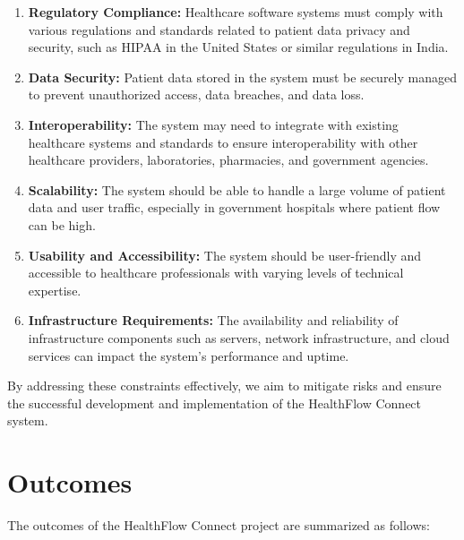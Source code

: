 \begin{enumerate}[label=\textbf{\arabic*.}]
  \item \textbf{Regulatory Compliance:} Healthcare software systems must comply with various regulations and standards related to patient data privacy and security, such as HIPAA in the United States or similar regulations in India.
  
  \item \textbf{Data Security:} Patient data stored in the system must be securely managed to prevent unauthorized access, data breaches, and data loss.
  
  \item \textbf{Interoperability:} The system may need to integrate with existing healthcare systems and standards to ensure interoperability with other healthcare providers, laboratories, pharmacies, and government agencies.
  
  \item \textbf{Scalability:} The system should be able to handle a large volume of patient data and user traffic, especially in government hospitals where patient flow can be high.
  
  \item \textbf{Usability and Accessibility:} The system should be user-friendly and accessible to healthcare professionals with varying levels of technical expertise.
  
  \item \textbf{Infrastructure Requirements:} The availability and reliability of infrastructure components such as servers, network infrastructure, and cloud services can impact the system's performance and uptime.
\end{enumerate}

By addressing these constraints effectively, we aim to mitigate risks and ensure the successful development and implementation of the HealthFlow Connect system.


\section{Outcomes}

The outcomes of the HealthFlow Connect project are summarized as follows:


